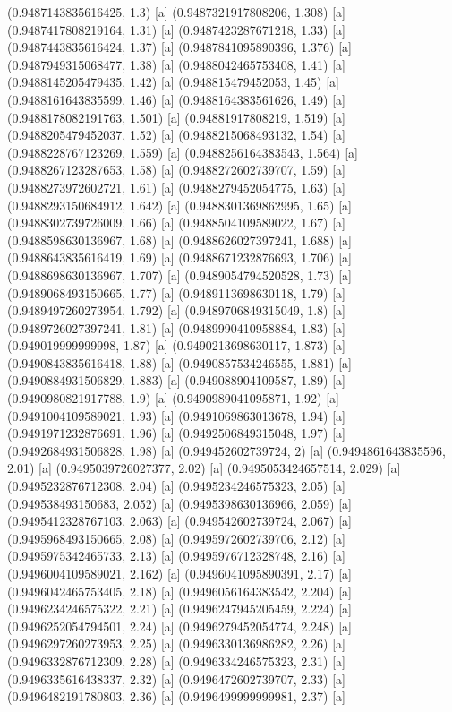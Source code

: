 {{{(0.9487143835616425, 1.3) [a] 
(0.9487321917808206, 1.308) [a] 
(0.9487417808219164, 1.31) [a] 
(0.9487423287671218, 1.33) [a] 
(0.9487443835616424, 1.37) [a] 
(0.9487841095890396, 1.376) [a] 
(0.9487949315068477, 1.38) [a] 
(0.9488042465753408, 1.41) [a] 
(0.9488145205479435, 1.42) [a] 
(0.948815479452053, 1.45) [a] 
(0.9488161643835599, 1.46) [a] 
(0.9488164383561626, 1.49) [a] 
(0.9488178082191763, 1.501) [a] 
(0.94881917808219, 1.519) [a] 
(0.9488205479452037, 1.52) [a] 
(0.9488215068493132, 1.54) [a] 
(0.9488228767123269, 1.559) [a] 
(0.9488256164383543, 1.564) [a] 
(0.9488267123287653, 1.58) [a] 
(0.9488272602739707, 1.59) [a] 
(0.9488273972602721, 1.61) [a] 
(0.9488279452054775, 1.63) [a] 
(0.9488293150684912, 1.642) [a] 
(0.9488301369862995, 1.65) [a] 
(0.9488302739726009, 1.66) [a] 
(0.9488504109589022, 1.67) [a] 
(0.9488598630136967, 1.68) [a] 
(0.9488626027397241, 1.688) [a] 
(0.9488643835616419, 1.69) [a] 
(0.9488671232876693, 1.706) [a] 
(0.9488698630136967, 1.707) [a] 
(0.9489054794520528, 1.73) [a] 
(0.9489068493150665, 1.77) [a] 
(0.9489113698630118, 1.79) [a] 
(0.9489497260273954, 1.792) [a] 
(0.9489706849315049, 1.8) [a] 
(0.9489726027397241, 1.81) [a] 
(0.9489990410958884, 1.83) [a] 
(0.949019999999998, 1.87) [a] 
(0.9490213698630117, 1.873) [a] 
(0.9490843835616418, 1.88) [a] 
(0.9490857534246555, 1.881) [a] 
(0.9490884931506829, 1.883) [a] 
(0.949088904109587, 1.89) [a] 
(0.9490980821917788, 1.9) [a] 
(0.9490989041095871, 1.92) [a] 
(0.9491004109589021, 1.93) [a] 
(0.9491069863013678, 1.94) [a] 
(0.9491971232876691, 1.96) [a] 
(0.9492506849315048, 1.97) [a] 
(0.9492684931506828, 1.98) [a] 
(0.949452602739724, 2) [a] 
(0.9494861643835596, 2.01) [a] 
(0.9495039726027377, 2.02) [a] 
(0.9495053424657514, 2.029) [a] 
(0.9495232876712308, 2.04) [a] 
(0.9495234246575323, 2.05) [a] 
(0.949538493150683, 2.052) [a] 
(0.9495398630136966, 2.059) [a] 
(0.9495412328767103, 2.063) [a] 
(0.949542602739724, 2.067) [a] 
(0.9495968493150665, 2.08) [a] 
(0.9495972602739706, 2.12) [a] 
(0.9495975342465733, 2.13) [a] 
(0.9495976712328748, 2.16) [a] 
(0.9496004109589021, 2.162) [a] 
(0.9496041095890391, 2.17) [a] 
(0.9496042465753405, 2.18) [a] 
(0.9496056164383542, 2.204) [a] 
(0.9496234246575322, 2.21) [a] 
(0.9496247945205459, 2.224) [a] 
(0.9496252054794501, 2.24) [a] 
(0.9496279452054774, 2.248) [a] 
(0.9496297260273953, 2.25) [a] 
(0.9496330136986282, 2.26) [a] 
(0.9496332876712309, 2.28) [a] 
(0.9496334246575323, 2.31) [a] 
(0.9496335616438337, 2.32) [a] 
(0.9496472602739707, 2.33) [a] 
(0.9496482191780803, 2.36) [a] 
(0.9496499999999981, 2.37) [a] 
}}}
